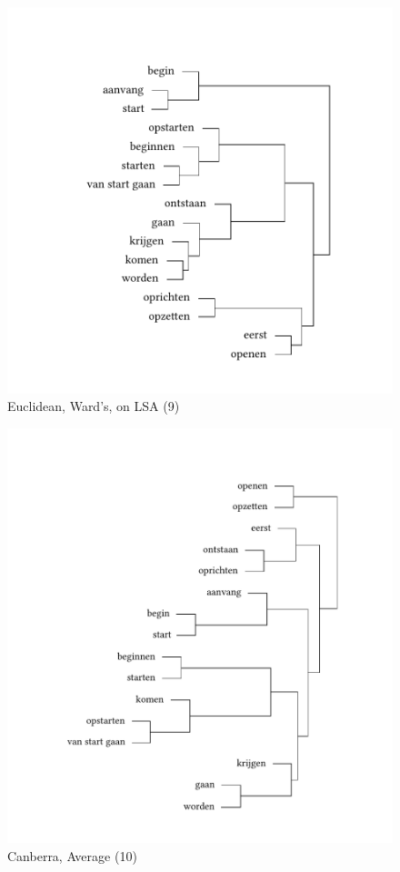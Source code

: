 \begin{figure}
\includegraphics[height=.4\textheight]{figures/tree38.pdf}
\caption{\label{fig:3:38}  Euclidean, Ward’s, on LSA (9)}
\end{figure}

\begin{figure}
\includegraphics[height=.4\textheight]{figures/tree39.pdf}
\caption{\label{fig:3:39}  Canberra, Average (10)}
\end{figure}

